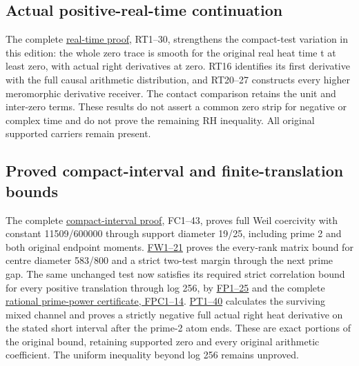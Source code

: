 \documentclass[
  10pt,
  a4paper,
]{article}
\begin{document}
\subsection{Actual positive-real-time
continuation}\label{actual-positive-real-time-continuation}

The complete \href{REAL_TIME_HEAT_TRACE_DERIVATION.md}{real-time proof},
RT1--30, strengthens the compact-test variation in this edition: the
whole zero trace is smooth for the original real heat time t at least
zero, with actual right derivatives at zero. RT16 identifies its first
derivative with the full causal arithmetic distribution, and RT20--27
constructs every higher meromorphic derivative receiver. The contact
comparison retains the unit and inter-zero terms. These results do not
assert a common zero strip for negative or complex time and do not prove
the remaining RH inequality. All original supported carriers remain
present.

\subsection{Proved compact-interval and finite-translation
bounds}\label{proved-compact-interval-and-finite-translation-bounds}

The complete \href{FIRST_PRIME_FULL_WEIL_COERCIVITY.md}{compact-interval
proof}, FC1--43, proves full Weil coercivity with constant 11509/600000
through support diameter 19/25, including prime 2 and both original
endpoint moments. \href{FIRST_PRIME_WINDOW_BOUND.md}{FW1--21} proves the
every-rank matrix bound for centre diameter 583/800 and a strict
two-test margin through the next prime gap. The same unchanged test now
satisfies its required strict correlation bound for every positive
translation through log 256, by
\href{FINITE_PRIME_WINDOW_EXTENSION.md}{FP1--25} and the complete
\href{FINITE_PRIME_WINDOW_COEFFICIENT_CERTIFICATE.md}{rational
prime-power certificate, FPC1--14}.
\href{PRIME_TWO_HEAT_TAIL_DERIVATION.md}{PT1--40} calculates the
surviving mixed channel and proves a strictly negative full actual right
heat derivative on the stated short interval after the prime-2 atom
ends. These are exact portions of the original bound, retaining
supported zero and every original arithmetic coefficient. The uniform
inequality beyond log 256 remains unproved.
\end{document}
